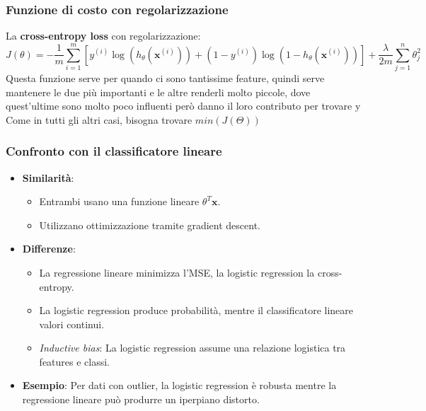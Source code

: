 \documentclass[10pt,oneside,a4paper]{article}
\begin{document}
	\subsubsection{Funzione di costo con regolarizzazione}
	La \textbf{cross-entropy loss} con regolarizzazione:
	\[
	J(\theta) = -\frac{1}{m} \sum_{i=1}^m \left[ y^{(i)} \log(h_\theta(\mathbf{x}^{(i)})) + (1-y^{(i)}) \log(1 - h_\theta(\mathbf{x}^{(i)})) \right] + \frac{\lambda}{2m} \sum_{j=1}^n \theta_j^2
	\]
	Questa funzione serve per quando ci sono tantissime feature, quindi serve mantenere le due più importanti e le altre renderli molto piccole, dove quest'ultime sono molto poco influenti però danno il loro contributo per trovare y\\
	Come in tutti gli altri casi, bisogna trovare $min(J(\Theta))$
	
	\subsubsection{Confronto con il classificatore lineare}
	\begin{itemize}
		\item \textbf{Similarità}:
		\begin{itemize}
			\item Entrambi usano una funzione lineare $\theta^T \mathbf{x}$.
			\item Utilizzano ottimizzazione tramite gradient descent.
		\end{itemize}
		\item \textbf{Differenze}:
		\begin{itemize}
			\item La regressione lineare minimizza l'MSE, la logistic regression la cross-entropy.
			\item La logistic regression produce probabilità, mentre il classificatore lineare valori continui.
			\item \textit{Inductive bias}: La logistic regression assume una relazione logistica tra features e classi.
		\end{itemize}
		\item \textbf{Esempio}: Per dati con outlier, la logistic regression è robusta mentre la regressione lineare può produrre un iperpiano distorto.
	\end{itemize}
	
\end{document}
